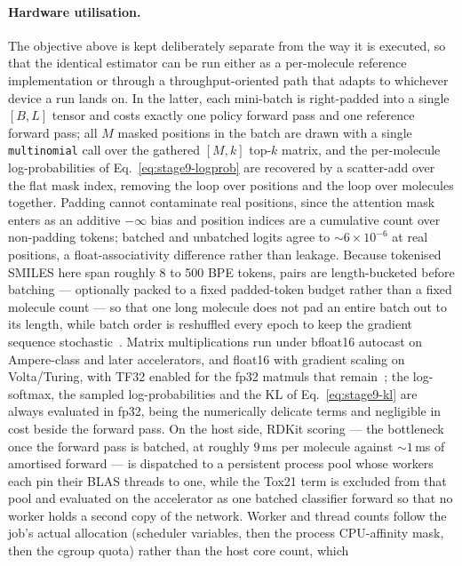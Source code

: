 \paragraph{Hardware utilisation.}
The objective above is kept deliberately separate from the way it is executed,
so that the identical estimator can be run either as a per-molecule reference
implementation or through a throughput-oriented path that adapts to whichever
device a run lands on. In the latter, each mini-batch is right-padded into a
single $[B, L]$ tensor and costs exactly one policy forward pass and one
reference forward pass; all $M$ masked positions in the batch are drawn with a
single \texttt{multinomial} call over the gathered $[M, k]$ top-$k$ matrix, and
the per-molecule log-probabilities of Eq.~\eqref{eq:stage9-logprob} are
recovered by a scatter-add over the flat mask index, removing the loop over
positions and the loop over molecules together. Padding cannot contaminate real
positions, since the attention mask enters as an additive $-\infty$ bias and
position indices are a cumulative count over non-padding tokens; batched and
unbatched logits agree to $\sim\!6\times10^{-6}$ at real positions, a
float-associativity difference rather than leakage. Because tokenised SMILES
here span roughly 8 to 500 BPE tokens, pairs are length-bucketed before batching
--- optionally packed to a fixed padded-token budget rather than a fixed
molecule count --- so that one long molecule does not pad an entire batch out to
its length, while batch order is reshuffled every epoch to keep the gradient
sequence stochastic~\cite{ott2018scaling}. Matrix multiplications run under
bfloat16 autocast on Ampere-class and later accelerators, and float16 with
gradient scaling on Volta/Turing, with TF32 enabled for the fp32 matmuls that
remain~\cite{micikevicius2018mixed}; the log-softmax, the sampled
log-probabilities and the KL of Eq.~\eqref{eq:stage9-kl} are always evaluated in
fp32, being the numerically delicate terms and negligible in cost beside the
forward pass. On the host side, RDKit scoring --- the bottleneck once the
forward pass is batched, at roughly $9$\,ms per molecule against $\sim\!1$\,ms
of amortised forward --- is dispatched to a persistent process pool whose
workers each pin their BLAS threads to one, while the Tox21 term is excluded
from that pool and evaluated on the accelerator as one batched classifier
forward so that no worker holds a second copy of the network. Worker and thread
counts follow the job's actual allocation (scheduler variables, then the process
CPU-affinity mask, then the cgroup quota) rather than the host core count, which
